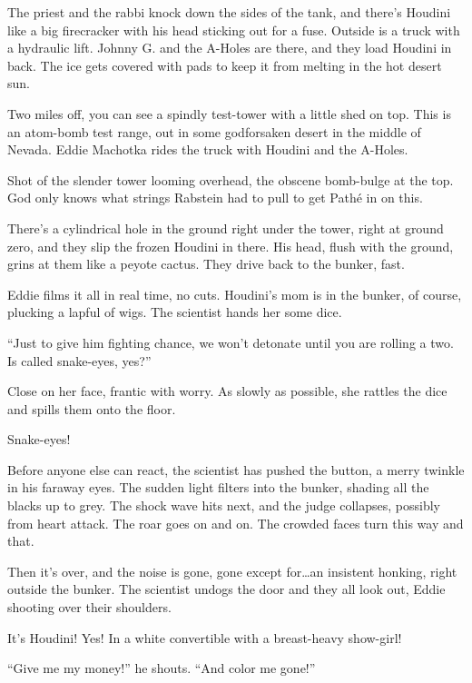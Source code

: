 The priest and the rabbi knock down the sides of the tank, and there’s Houdini like a big firecracker with his head sticking out for a fuse. Outside is a truck with a hydraulic lift. Johnny G. and the A-Holes are there, and they load Houdini in back. The ice gets covered with pads to keep it from melting in the hot desert sun.

Two miles off, you can see a spindly test-tower with a little shed on top. This is an atom-bomb test range, out in some godforsaken desert in the middle of Nevada. Eddie Machotka rides the truck with Houdini and the A-Holes.

Shot of the slender tower looming overhead, the obscene bomb-bulge at the top. God only knows what strings Rabstein had to pull to get Pathé in on this.

There’s a cylindrical hole in the ground right under the tower, right at ground zero, and they slip the frozen Houdini in there. His head, flush with the ground, grins at them like a peyote cactus. They drive back to the bunker, fast.

Eddie films it all in real time, no cuts. Houdini’s mom is in the bunker, of course, plucking a lapful of wigs. The scientist hands her some dice.

“Just to give him fighting chance, we won’t detonate until you are rolling a two. Is called snake-eyes, yes?”

Close on her face, frantic with worry. As slowly as possible, she rattles the dice and spills them onto the floor.

Snake-eyes!

Before anyone else can react, the scientist has pushed the button, a merry twinkle in his faraway eyes. The sudden light filters into the bunker, shading all the blacks up to grey. The shock wave hits next, and the judge collapses, possibly from heart attack. The roar goes on and on. The crowded faces turn this way and that.

Then it’s over, and the noise is gone, gone except for…an insistent honking, right outside the bunker. The scientist undogs the door and they all look out, Eddie shooting over their shoulders.

It’s Houdini! Yes! In a white convertible with a breast-heavy show-girl!

“Give me my money!” he shouts. “And color me gone!”
